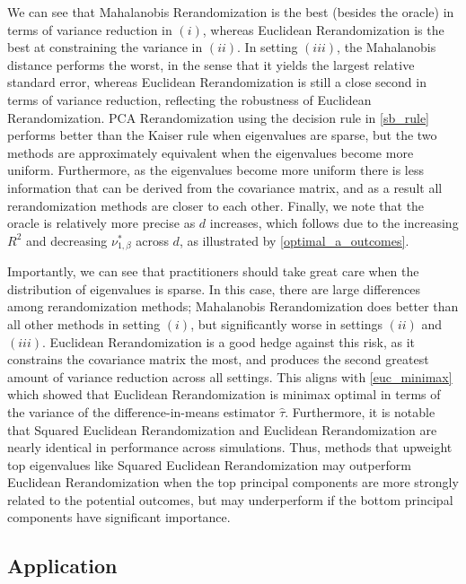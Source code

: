 \documentclass[11pt,twoside]{article}
\theoremstyle{definition}
\theoremstyle{remark}
\begin{document}
We can see that Mahalanobis Rerandomization is the best (besides the oracle) in terms of variance reduction in $(i)$, whereas Euclidean Rerandomization is the best at constraining the variance in $(ii)$. In setting $(iii)$, the Mahalanobis distance performs the worst, in the sense that it yields the largest relative standard error, whereas Euclidean Rerandomization is still a close second in terms of variance reduction, reflecting the robustness of Euclidean Rerandomization. PCA Rerandomization using the decision rule in \cref{sb_rule} performs better than the Kaiser rule when eigenvalues are sparse, but the two methods are approximately equivalent when the eigenvalues become more uniform. Furthermore, as the eigenvalues become more uniform there is less information that can be derived from the covariance matrix, and as a result all rerandomization methods are closer to each other. Finally, we note that the oracle is relatively more precise as $d$ increases, which follows due to the increasing $R^2$ and decreasing $\nu^*_{1, \beta}$ across $d$, as illustrated by \cref{optimal_a_outcomes}.


Importantly, we can see that practitioners should take great care when the distribution of eigenvalues is sparse. In this case, there are large differences among rerandomization methods; Mahalanobis Rerandomization does better than all other methods in setting $(i)$, but significantly worse in settings $(ii)$ and $(iii)$. Euclidean Rerandomization is a good hedge against this risk, as it constrains the covariance matrix the most, and produces the second greatest amount of variance reduction across all settings. This aligns with \cref{euc_minimax} which showed that Euclidean Rerandomization is minimax optimal in terms of the variance of the difference-in-means estimator $\widehat{\tau}$. Furthermore, it is notable that Squared Euclidean Rerandomization and Euclidean Rerandomization are nearly identical in performance across simulations. Thus, methods that upweight top eigenvalues like Squared Euclidean Rerandomization may outperform Euclidean Rerandomization when the top principal components are more strongly related to the potential outcomes, but may underperform if the bottom principal components have significant importance.

\subsection{Application}
\end{document}
